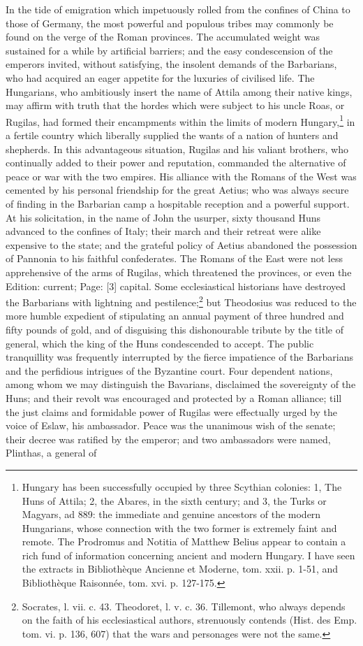 In the tide of emigration which impetuously rolled from the confines of China to those of Germany, the most powerful and populous tribes may commonly be found on the verge of the Roman provinces. The accumulated weight was sustained for a while by artificial barriers; and the easy condescension of the emperors invited, without satisfying, the insolent demands of the Barbarians, who had acquired an eager appetite for the luxuries of civilised life. The Hungarians, who ambitiously insert the name of Attila among their native kings, may affirm with truth that the hordes which were subject to his uncle Roas, or Rugilas, had formed their encampments within the limits of modern Hungary,\footnote{Hungary has been successfully occupied by three Scythian colonies: 1, The Huns of Attila; 2, the Abares, in the sixth century; and 3, the Turks or Magyars, ad 889: the immediate and genuine ancestors of the modern Hungarians, whose connection with the two former is extremely faint and remote. The Prodromus and Notitia of Matthew Belius appear to contain a rich fund of information concerning ancient and modern Hungary. I have seen the extracts in Bibliothèque Ancienne et Moderne, tom. xxii. p. 1-51, and Bibliothèque Raisonnée, tom. xvi. p. 127-175.} in a fertile country which liberally supplied the wants of a nation of hunters and shepherds. In this advantageous situation, Rugilas and his valiant brothers, who continually added to their power and reputation, commanded the alternative of peace or war with the two empires. His alliance with the Romans of the West was cemented by his personal friendship for the great Aetius; who was always secure of finding in the Barbarian camp a hospitable reception and a powerful support. At his solicitation, in the name of John the usurper, sixty thousand Huns advanced to the confines of Italy; their march and their retreat were alike expensive to the state; and the grateful policy of Aetius abandoned the possession of Pannonia to his faithful confederates. The Romans of the East were not less apprehensive of the arms of Rugilas, which threatened the provinces, or even the Edition: current; Page: [3] capital. Some ecclesiastical historians have destroyed the Barbarians with lightning and pestilence;\footnote{Socrates, l. vii. c. 43. Theodoret, l. v. c. 36. Tillemont, who always depends on the faith of his ecclesiastical authors, strenuously contends (Hist. des Emp. tom. vi. p. 136, 607) that the wars and personages were not the same.} but Theodosius was reduced to the more humble expedient of stipulating an annual payment of three hundred and fifty pounds of gold, and of disguising this dishonourable tribute by the title of general, which the king of the Huns condescended to accept. The public tranquillity was frequently interrupted by the fierce impatience of the Barbarians and the perfidious intrigues of the Byzantine court. Four dependent nations, among whom we may distinguish the Bavarians, disclaimed the sovereignty of the Huns; and their revolt was encouraged and protected by a Roman alliance; till the just claims and formidable power of Rugilas were effectually urged by the voice of Eslaw, his ambassador. Peace was the unanimous wish of the senate; their decree was ratified by the emperor; and two ambassadors were named, Plinthas, a general of 